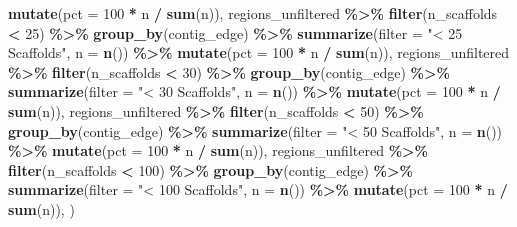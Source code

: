 \documentclass[
]{article}
\newenvironment{Shaded}{\begin{snugshade}}{\end{snugshade}}
\newcommand{\AttributeTok}[1]{\textcolor[rgb]{0.13,0.29,0.53}{#1}}
\newcommand{\DecValTok}[1]{\textcolor[rgb]{0.00,0.00,0.81}{#1}}
\newcommand{\FunctionTok}[1]{\textcolor[rgb]{0.13,0.29,0.53}{\textbf{#1}}}
\newcommand{\NormalTok}[1]{#1}
\newcommand{\SpecialCharTok}[1]{\textcolor[rgb]{0.81,0.36,0.00}{\textbf{#1}}}
\newcommand{\StringTok}[1]{\textcolor[rgb]{0.31,0.60,0.02}{#1}}
\begin{document}
\begin{Shaded}
\begin{Highlighting}[]
    \FunctionTok{mutate}\NormalTok{(}\AttributeTok{pct =} \DecValTok{100} \SpecialCharTok{*}\NormalTok{ n }\SpecialCharTok{/} \FunctionTok{sum}\NormalTok{(n)),}
\NormalTok{  regions\_unfiltered }\SpecialCharTok{\%\textgreater{}\%}
    \FunctionTok{filter}\NormalTok{(n\_scaffolds }\SpecialCharTok{\textless{}} \DecValTok{25}\NormalTok{) }\SpecialCharTok{\%\textgreater{}\%}
    \FunctionTok{group\_by}\NormalTok{(contig\_edge) }\SpecialCharTok{\%\textgreater{}\%}
    \FunctionTok{summarize}\NormalTok{(}\AttributeTok{filter =} \StringTok{"\textless{} 25 Scaffolds"}\NormalTok{, }\AttributeTok{n =} \FunctionTok{n}\NormalTok{()) }\SpecialCharTok{\%\textgreater{}\%}
    \FunctionTok{mutate}\NormalTok{(}\AttributeTok{pct =} \DecValTok{100} \SpecialCharTok{*}\NormalTok{ n }\SpecialCharTok{/} \FunctionTok{sum}\NormalTok{(n)),}
\NormalTok{  regions\_unfiltered }\SpecialCharTok{\%\textgreater{}\%}
    \FunctionTok{filter}\NormalTok{(n\_scaffolds }\SpecialCharTok{\textless{}} \DecValTok{30}\NormalTok{) }\SpecialCharTok{\%\textgreater{}\%}
    \FunctionTok{group\_by}\NormalTok{(contig\_edge) }\SpecialCharTok{\%\textgreater{}\%}
    \FunctionTok{summarize}\NormalTok{(}\AttributeTok{filter =} \StringTok{"\textless{} 30 Scaffolds"}\NormalTok{, }\AttributeTok{n =} \FunctionTok{n}\NormalTok{()) }\SpecialCharTok{\%\textgreater{}\%}
    \FunctionTok{mutate}\NormalTok{(}\AttributeTok{pct =} \DecValTok{100} \SpecialCharTok{*}\NormalTok{ n }\SpecialCharTok{/} \FunctionTok{sum}\NormalTok{(n)),}
\NormalTok{  regions\_unfiltered }\SpecialCharTok{\%\textgreater{}\%}
    \FunctionTok{filter}\NormalTok{(n\_scaffolds }\SpecialCharTok{\textless{}} \DecValTok{50}\NormalTok{) }\SpecialCharTok{\%\textgreater{}\%}
    \FunctionTok{group\_by}\NormalTok{(contig\_edge) }\SpecialCharTok{\%\textgreater{}\%}
    \FunctionTok{summarize}\NormalTok{(}\AttributeTok{filter =} \StringTok{"\textless{} 50 Scaffolds"}\NormalTok{, }\AttributeTok{n =} \FunctionTok{n}\NormalTok{()) }\SpecialCharTok{\%\textgreater{}\%}
    \FunctionTok{mutate}\NormalTok{(}\AttributeTok{pct =} \DecValTok{100} \SpecialCharTok{*}\NormalTok{ n }\SpecialCharTok{/} \FunctionTok{sum}\NormalTok{(n)),}
\NormalTok{  regions\_unfiltered }\SpecialCharTok{\%\textgreater{}\%}
    \FunctionTok{filter}\NormalTok{(n\_scaffolds }\SpecialCharTok{\textless{}} \DecValTok{100}\NormalTok{) }\SpecialCharTok{\%\textgreater{}\%}
    \FunctionTok{group\_by}\NormalTok{(contig\_edge) }\SpecialCharTok{\%\textgreater{}\%}
    \FunctionTok{summarize}\NormalTok{(}\AttributeTok{filter =} \StringTok{"\textless{} 100 Scaffolds"}\NormalTok{, }\AttributeTok{n =} \FunctionTok{n}\NormalTok{()) }\SpecialCharTok{\%\textgreater{}\%}
    \FunctionTok{mutate}\NormalTok{(}\AttributeTok{pct =} \DecValTok{100} \SpecialCharTok{*}\NormalTok{ n }\SpecialCharTok{/} \FunctionTok{sum}\NormalTok{(n)),}
\NormalTok{)}


\end{Highlighting}
\end{Shaded}
\end{document}
